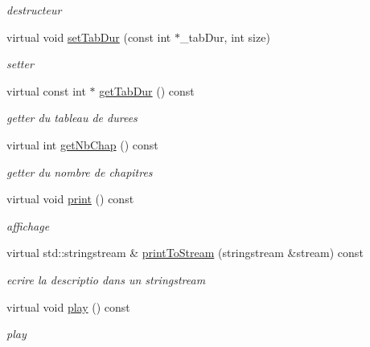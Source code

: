 \begin{DoxyCompactItemize}
\begin{DoxyCompactList}\small\item\em destructeur \end{DoxyCompactList}\item 
virtual void \hyperlink{classFilm_a27097a4f146d22c069f4ac429d40372d}{set\-Tab\-Dur} (const int $\ast$\-\_\-tab\-Dur, int size)
\begin{DoxyCompactList}\small\item\em setter \end{DoxyCompactList}\item 
virtual const int $\ast$ \hyperlink{classFilm_a3ac1dee35b575835c68e92bf64826618}{get\-Tab\-Dur} () const 
\begin{DoxyCompactList}\small\item\em getter du tableau de durees \end{DoxyCompactList}\item 
virtual int \hyperlink{classFilm_a0dfdcf162d9a84e965c22435ca146310}{get\-Nb\-Chap} () const 
\begin{DoxyCompactList}\small\item\em getter du nombre de chapitres \end{DoxyCompactList}\item 
\hypertarget{classFilm_a2dfafda0577fa5292674cb937eb7c6aa}{virtual void \hyperlink{classFilm_a2dfafda0577fa5292674cb937eb7c6aa}{print} () const }\label{classFilm_a2dfafda0577fa5292674cb937eb7c6aa}

\begin{DoxyCompactList}\small\item\em affichage \end{DoxyCompactList}\item 
\hypertarget{classFilm_a0fb4461cad5926a69443041887b21dbc}{virtual std\-::stringstream \& \hyperlink{classFilm_a0fb4461cad5926a69443041887b21dbc}{print\-To\-Stream} (stringstream \&stream) const }\label{classFilm_a0fb4461cad5926a69443041887b21dbc}

\begin{DoxyCompactList}\small\item\em ecrire la descriptio dans un stringstream \end{DoxyCompactList}\item 
\hypertarget{classFilm_a2da141229a61f420e3fc099124434700}{virtual void \hyperlink{classFilm_a2da141229a61f420e3fc099124434700}{play} () const }\label{classFilm_a2da141229a61f420e3fc099124434700}

\begin{DoxyCompactList}\small\item\em play \end{DoxyCompactList}\end{DoxyCompactItemize}
